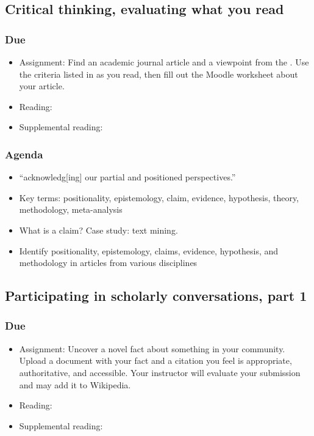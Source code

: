 \documentclass[12pt,article,oneside]{memoir}
\begin{document}
\subsection{Critical thinking, evaluating what you read}
\subsubsection{Due}
\begin{itemize}
 \item Assignment: Find an academic journal article and a viewpoint from the .  Use the criteria listed in \cite{evaluation} as you read, then fill out the Moodle worksheet about your article.
 \item Reading: \cite{evaluation}
 \item Supplemental reading: \cite{incorporating,religion}
\end{itemize}

\subsubsection{Agenda}
\begin{itemize}
\item ``acknowledg[ing] our partial and positioned perspectives.'' \cite{finn2003just}
\item Key terms: positionality, epistemology, claim, evidence, hypothesis, theory, methodology, meta-analysis
\item What is a claim?  Case study: text mining.
\item Identify positionality, epistemology, claims, evidence, hypothesis, and methodology in articles from various disciplines
\end{itemize}

\subsection{Participating in scholarly conversations, part 1}
\subsubsection{Due}
\begin{itemize}
 \item Assignment: Uncover a novel fact about something in your community.  Upload a document with your fact and a citation you feel is appropriate, authoritative, and accessible.  Your instructor will evaluate your submission and may add it to Wikipedia.
 \item Reading: \cite{eval}
 \item Supplemental reading: \cite{training}
\end{itemize}
\end{document}
